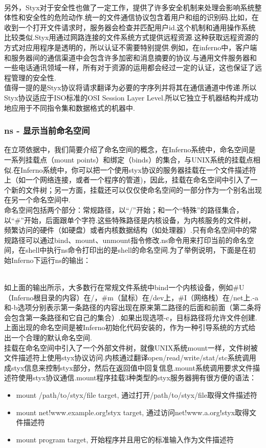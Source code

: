 \documentclass[paper=a4]{ctexart} %
\numberwithin{equation}{section} %
\numberwithin{figure}{section} %
\numberwithin{table}{section} %
\newcommand{\n}{\\\indent}
\begin{document}
~\n  另外，Styx对于安全性也做了一定工作，提供了许多安全机制来处理会影响系统整体性和安全性的危险动作.统一的文件通信协议包含着用户和组的识别码.比如，在收到一个打开文件请求时，服务器会检查并匹配用户id.这个机制和通用操作系统比较类似.Styx用通过网路连接的文件系统方式提供远程资源.这种获取远程资源的方式对应用程序是透明的，所以认证不需要特别提供.例如，在inferno中，客户端和服务器间的通信渠道中会包含许多加密和消息摘要的协议.与通用文件服务器和一些电话通讯领域一样，所有对于资源的运用都会经过一定的认证，这也保证了远程管理的安全性.\n
  值得一提的是Styx协议将请求翻译为必要的字序列并将其在通信通道中传递.所以Styx协议适应于ISO标准的OSI Session Layer Level.所以它独立于机器结构并成功地应用于不同指令集和数据格式的机器中.

\subsubsection{ns - 显示当前命名空间}
 在立项依据中，我们简要介绍了命名空间的概念，在Inferno系统中，命名空间是一系列挂载点（mount points）和绑定（binds）的集合，与UNIX系统的挂载点相似.在Inferno系统中，你可以把一个使用styx协议的服务器挂载在一个文件描述符上（如一个网络连接，或者一个程序的管道)，因此，挂载在命名空间中引入了一个新的文件树；另一方面，挂载还可以仅仅使命名空间的一部分作为一个别名出现在另一个命名空间中.\n
命名空间包括两个部分：常规路径，以“/”开始；和一个“特殊”的路径集合，以“\#”开始，后面跟单个字符.这些特殊路径是内核设备，为内核服务的文件树，频繁访问的硬件（如硬盘）或者内核数据结构（如处理器）.只有命名空间中的常规路径可以通过bind、mount、unmount指令修改.ns命令用来打印当前的命名空间，在shell中执行ns命令打印出的是shell的命名空间.为了举例说明，下面是在初始Inferno下运行ns的输出：

 ~\n
 如上面的输出所示，大多数行在常规文件系统中bind一个内核设备，例如\#U（Inferno根目录的内容）在/，\#m（鼠标）在/dev上，\#I（网络栈）在/net上.-a和-b选项分别表示第一条路径的内容出现在原来第二路径的后面和前面（第二条将会包含第一条路径和它自己的集合）.如果出现选项-c，目标路径将允许文件创建.上面出现的命名空间是被Inferno初始化代码安装的，作为一种引导系统的方式给出一个合理的默认命名空间.
\n
挂载在命名空间中引入了一个外部文件树，就像UNIX系统mount一样，文件树被文件描述符上使用styx协议访问.内核通过翻译open/read/write/stat/stc系统调用成styx信息来控制styx部分，然后在返回值中回复信息.mount系统调用要求文件描述符使用styx协议通信.mount程序挂载3种类型的styx服务器拥有很方便的语法：

\begin{itemize}
\item mount /path/to/styx/file target, 通过打开/path/to/styx/file取得文件描述符
\item mount net!www.example.org!styx target, 通过访问net!www.a.org!styx取得文件描述符
\item mount {program} target, 开始程序并且用它的标准输入作为文件描述符
\end{itemize}
\end{document}
